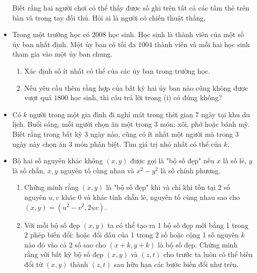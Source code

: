\documentclass[11pt]{scrartcl}
\begin{document}
\begin{itemize}[label=, leftmargin=0em, itemsep=0.5em]
\begin{btvn}
\begin{enumerate}
        \end{enumerate}
        Biết rằng hai người chơi có thể thấy được số ghi trên tất cả các tấm thẻ trên bàn và trong tay đối thủ. Hỏi ai là người có chiến thuật thắng.
    \end{btvn}
    \item \begin{btvn}
        Trong một trường học có $2008$ học sinh. Học sinh là thành viên của một số ủy ban nhất định. Một ủy ban có tối đa $1004$ thành viên và mỗi hai học sinh tham gia vào một ủy ban chung.
        \begin{enumerate}
            \item Xác định số ít nhất có thể của các ủy ban trong trường học.
            \item Nếu yêu cầu thêm rằng hợp của bất kỳ hai ủy ban nào cũng không được vượt quá $1800$ học sinh, thì câu trả lời trong (i) có đúng không?
        \end{enumerate}
    \end{btvn}
    \item \begin{btvn} Có $k$ người trong một gia đình đi nghỉ mát trong thời gian 7 ngày tại khu du lịch. Buổi sáng, mỗi người chọn ăn một trong 3 món: xôi, phở hoặc bánh mỳ. Biết rằng trong bất kỳ 3 ngày nào, cũng có ít nhất một người mà trong 3 ngày này chọn ăn 3 món phân biệt. Tìm giá trị nhỏ nhất có thể của $k$.
        
    \end{btvn}
    
    \item \begin{btvn}
    Bộ hai số nguyên khác không $(x, y)$ được gọi là "bộ số đẹp" nếu $x$ là số lẻ, $y$ là số chẵn, $x, y$ nguyên tố cùng nhau và $x^2 - y^2$ là số chính phương.
    \begin{enumerate}
        \item Chứng minh rằng $(x, y)$ là "bộ số đẹp" khi và chỉ khi tồn tại 2 số nguyên $u, v$ khác $0$ và khác tính chẵn lẻ, nguyên tố cùng nhau sao cho $(x, y) = (u^2 - v^2, 2uv)$.
        \item Với mỗi bộ số đẹp $(x, y)$ ta có thể tạo ra 1 bộ số đẹp mới bằng 1 trong 2 phép biến đổi: hoặc đổi dấu của 1 trong 2 số hoặc cộng 1 số nguyên $k$ nào đó vào cả 2 số sao cho $(x + k, y + k)$ là bộ số đẹp. Chứng minh rằng với bất kỳ bộ số đẹp $(x, y)$ và $(z, t)$ cho trước ta luôn có thể biến đổi từ $(x, y)$ thành $(z, t)$ sau hữu hạn các bước biến đổi như trên.
    \end{enumerate}
    

\end{btvn}
\end{itemize}
\end{document}
